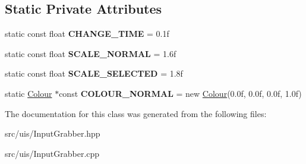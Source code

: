 \subsection*{Static Private Attributes}
\begin{DoxyCompactItemize}
\item 
\mbox{\label{class_flounder_1_1_input_grabber_aef4dd7e1950374a409154ea1577219c5}} 
static const float {\bfseries C\+H\+A\+N\+G\+E\+\_\+\+T\+I\+ME} = 0.\+1f
\item 
\mbox{\label{class_flounder_1_1_input_grabber_a91c75aa9917311fd29c8be38fe5a4c5d}} 
static const float {\bfseries S\+C\+A\+L\+E\+\_\+\+N\+O\+R\+M\+AL} = 1.\+6f
\item 
\mbox{\label{class_flounder_1_1_input_grabber_ac1c7770533f4acc2630ba1a53da41751}} 
static const float {\bfseries S\+C\+A\+L\+E\+\_\+\+S\+E\+L\+E\+C\+T\+ED} = 1.\+8f
\item 
\mbox{\label{class_flounder_1_1_input_grabber_ac7c3d48a032459b179955ebaeabcefee}} 
static \hyperlink{class_flounder_1_1_colour}{Colour} $\ast$const {\bfseries C\+O\+L\+O\+U\+R\+\_\+\+N\+O\+R\+M\+AL} = new \hyperlink{class_flounder_1_1_colour}{Colour}(0.\+0f, 0.\+0f, 0.\+0f, 1.\+0f)
\end{DoxyCompactItemize}


The documentation for this class was generated from the following files\+:\begin{DoxyCompactItemize}
\item 
src/uis/Input\+Grabber.\+hpp\item 
src/uis/Input\+Grabber.\+cpp\end{DoxyCompactItemize}
